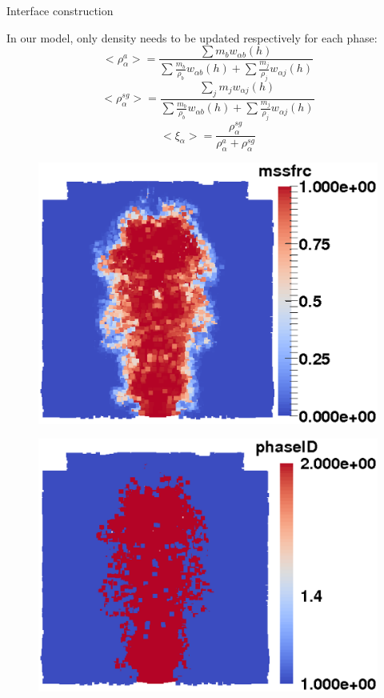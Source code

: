 \documentclass{beamer}
\begin{document}
\begin{frame}{Interface construction}
\noindent
\begin{minipage}{0.65 \textwidth}
In our model, only density needs to be updated respectively for each phase:
\begin{equation}
<\rho_{\alpha}^a>=\frac{\sum m_b w_{\alpha b} \left(h\right)}{\sum \frac{m_b}{\rho_b} w_{\alpha b} \left(h\right) +\sum \frac{m_j}{\rho_j} w_{\alpha j} \left(h\right)} \label{eq:gov-sph-d1}
\end{equation}
\begin{equation}
<\rho_\alpha^{sg}>=\frac{\sum_j m_j w_{\alpha j} \left(h\right)}{\sum \frac{m_b}{\rho_b} w_{\alpha b} \left(h\right) +\sum \frac{m_j}{\rho_j} w_{\alpha j} \left(h\right)} \label{eq:gov-sph-d2}
\end{equation}
\begin{equation}
<\xi_{\alpha}> = \dfrac{\rho^{sg}_{\alpha}}{\rho_{\alpha}^{a}+\rho_{\alpha}^{sg}}
\label{eq:gov-sph-xi}
\end{equation}
\end{minipage}
\begin{minipage}{0.27 \textwidth}
\begin{figure}
\includegraphics[width=0.95 \textwidth]{./PPT/Interface_msf_rs}
\end{figure}
\begin{figure}
\includegraphics[width=0.95 \textwidth]{./PPT/Interface_phase_rs}

\end{figure}
\end{minipage}
\end{frame}
\end{document}
